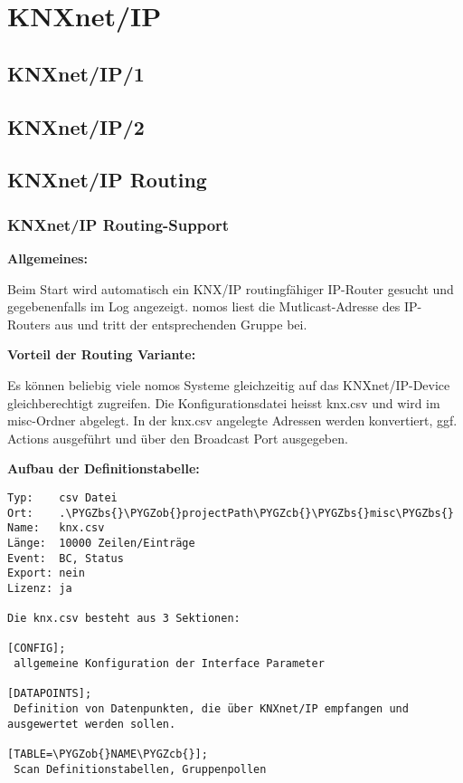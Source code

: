 \documentclass[letterpaper,10pt,english]{sphinxmanual}
\def\PYGZbs{\char`\\}
\def\PYGZob{\char`\{}
\def\PYGZcb{\char`\}}
\begin{document}
\section{KNXnet/IP}
\label{chapter_5:knxnet-ip}

\subsection{KNXnet/IP/1}
\label{chapter_5:knxnet-ip-1}

\subsection{KNXnet/IP/2}
\label{chapter_5:knxnet-ip-2}

\subsection{KNXnet/IP Routing}
\label{chapter_5:knxnet-ip-routing}

\subsubsection{KNXnet/IP Routing-Support}
\label{chapter_5:knxnet-ip-routing-support}
\begin{DUlineblock}{0em}
\item[] \textbf{Allgemeines:}
\item[] Beim Start wird automatisch ein KNX/IP routingfähiger IP-Router gesucht und gegebenenfalls im Log angezeigt. nomos liest die Mutlicast-Adresse des IP-Routers aus und tritt der entsprechenden Gruppe bei.
\end{DUlineblock}

\begin{DUlineblock}{0em}
\item[] \textbf{Vorteil der Routing Variante:}
\item[] Es können beliebig viele nomos Systeme gleichzeitig auf das KNXnet/IP-Device gleichberechtigt zugreifen. Die Konfigurationsdatei heisst knx.csv und wird im misc-Ordner abgelegt. In der knx.csv angelegte Adressen werden konvertiert, ggf. Actions ausgeführt und über den Broadcast Port ausgegeben.
\end{DUlineblock}

\textbf{Aufbau der Definitionstabelle:}

\begin{Verbatim}[commandchars=\\\{\}]
Typ:    csv Datei
Ort:    .\PYGZbs{}\PYGZob{}projectPath\PYGZcb{}\PYGZbs{}misc\PYGZbs{}
Name:   knx.csv
Länge:  10000 Zeilen/Einträge
Event:  BC, Status
Export: nein
Lizenz: ja

Die knx.csv besteht aus 3 Sektionen:

[CONFIG];
 allgemeine Konfiguration der Interface Parameter

[DATAPOINTS];
 Definition von Datenpunkten, die über KNXnet/IP empfangen und ausgewertet werden sollen.

[TABLE=\PYGZob{}NAME\PYGZcb{}];
 Scan Definitionstabellen, Gruppenpollen
\end{Verbatim}
\end{document}
